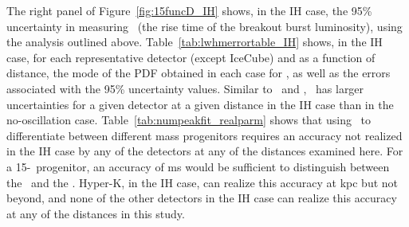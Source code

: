The right panel of Figure~\ref{fig:15funcD_IH} shows, in the IH case, the  95\% uncertainty
in measuring \trise\ (the rise time of the breakout burst 
luminosity), using the analysis outlined above. 
Table~\ref{tab:lwhmerrortable_IH}  shows, in the IH case, for each
representative detector (except IceCube) and as a function of
distance, the mode of the PDF obtained in each case for \trise, as well
as the errors associated with the 95\% uncertainty values.
 Similar to \lmax\
and \tmax, \trise\ has larger uncertainties for a given detector at a
given distance in the IH case than in the no-oscillation case.  
Table~\ref{tab:numpeakfit_realparm} shows that using \trise\ to
differentiate between different mass progenitors requires an accuracy
not realized in the IH case by any of the detectors at any of  
the distances examined
here.  For a 15-\Msol\ progenitor, an accuracy of  ms would be
sufficient to distinguish between the \ls\ and the \shen.  Hyper-K, in
the IH case, can
realize this accuracy at  kpc but not beyond, and none of the other
detectors in the IH case can realize this accuracy at any of the 
distances in this study. 

